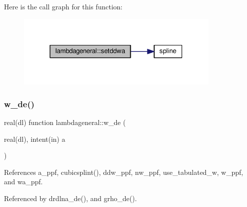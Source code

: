 Here is the call graph for this function\+:
\nopagebreak
\begin{figure}[H]
\begin{center}
\leavevmode
\includegraphics[width=280pt]{namespacelambdageneral_ad21de3de68d0d0e75156e818dd8b49e1_cgraph}
\end{center}
\end{figure}
\mbox{\label{namespacelambdageneral_a5025e65d45f07326ea66833cbab495d3}} 
\subsubsection{\texorpdfstring{w\+\_\+de()}{w\_de()}}
{\footnotesize\ttfamily real(dl) function lambdageneral\+::w\+\_\+de (\begin{DoxyParamCaption}\item[{real(dl), intent(in)}]{a }\end{DoxyParamCaption})}



References a\+\_\+ppf, cubicsplint(), ddw\+\_\+ppf, nw\+\_\+ppf, use\+\_\+tabulated\+\_\+w, w\+\_\+ppf, and wa\+\_\+ppf.



Referenced by drdlna\+\_\+de(), and grho\+\_\+de().

